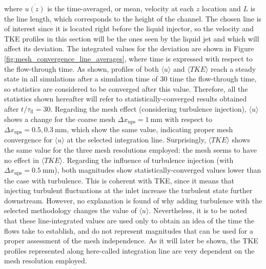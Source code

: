 where $\overline{u \left( z \right)}$ is the time-averaged, or mean, velocity at each $z$ location and $L$ is the line length, which corresponds to the height of the channel. The chosen line is of interest since it is located right before the liquid injector, so the velocity and TKE profiles in this section will be the ones seen by the liquid jet and which will affect its deviation. The integrated values for the deviation are shown in Figure \ref{fig:mesh_convergence_line_averages}, where time is expressed with respect to the flow-through time. As shown, profiles of both $\langle u \rangle$ and $\langle TKE \rangle$ reach a steady state in all simulations after a simulation time of $30$ time the flow-through time, so statistics are considered to be converged after this value. Therefore, all the statistics shown hereafter will refer to statistically-converged results obtained after $t / \tau_\mathrm{fl} = 30$. Regarding the mesh effect (considering turbulence injection), $\langle u \rangle$ shows a change for the coarse mesh $\Delta x_\mathrm{ups} = 1~\mathrm{mm}$ with respect to $\Delta x_\mathrm{ups} = 0.5, 0.3~\mathrm{mm}$, which show the same value, indicating proper mesh convergence for $\langle u \rangle$ at the selected integration line. Surprisingly, $\langle TKE \rangle$ shows the same value for the three mesh resolutions employed: the mesh seems to have no effect in $\langle TKE \rangle$. Regarding the influence of turbulence injection (with $\Delta x_\mathrm{ups} = 0.5~\mathrm{mm}$), both magnitudes show statistically-converged values lower than the case with turbulence. This is coherent with TKE, since it means that injecting turbulent fluctuations at the inlet increase the turbulent state further downstream. However, no explanation is found of why adding turbulence with the selected methodology changes the value of $\langle u \rangle$. Nevertheless, it is to be noted that these line-integrated values are used only to obtain an idea of the time the flows take to establish, and do not represent magnitudes that can be used for a proper assessment of the mesh independence. As it will later be shown, the TKE profiles represented along here-called integration line are very dependent on the mesh resolution employed.


